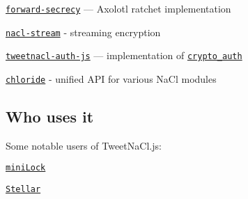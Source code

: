 \begin{DoxyItemize}
\item \href{https://github.com/alax/forward-secrecy}{\tt forward-\/secrecy} — Axolotl ratchet implementation
\item \href{https://github.com/dchest/nacl-stream-js}{\tt nacl-\/stream} -\/ streaming encryption
\item \href{https://github.com/dchest/tweetnacl-auth-js}{\tt tweetnacl-\/auth-\/js} — implementation of \href{http://nacl.cr.yp.to/auth.html}{\tt {\ttfamily crypto\+\_\+auth}}
\item \href{https://github.com/dominictarr/chloride}{\tt chloride} -\/ unified A\+PI for various Na\+Cl modules
\end{DoxyItemize}

\subsection*{Who uses it }

Some notable users of Tweet\+Na\+Cl.\+js\+:


\begin{DoxyItemize}
\item \href{http://minilock.io/}{\tt mini\+Lock}
\item \href{https://www.stellar.org/}{\tt Stellar} 
\end{DoxyItemize}